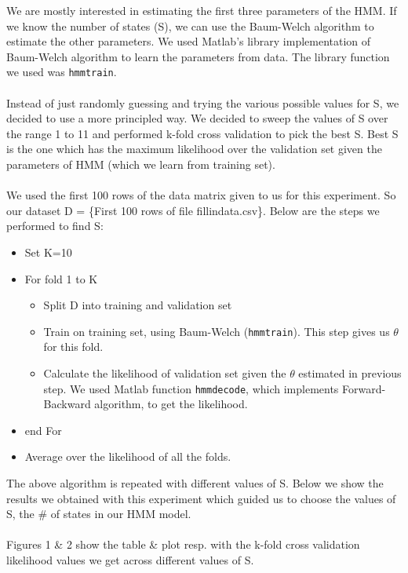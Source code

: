 \documentclass[12pt]{article}
\begin{document}
We are mostly interested in estimating the first three parameters of the HMM. If we know the number of states (S), we can use the Baum-Welch algorithm to estimate the other parameters. We used Matlab's library implementation of Baum-Welch algorithm to learn the parameters from data. The library function we used was \verb|hmmtrain|. \\
\\
Instead of just randomly guessing and trying the various possible values for S, we decided to use a more principled way. We decided to sweep the values of S over the range 1 to 11 and performed k-fold cross validation to pick the best S. Best S is the one which has the maximum likelihood over the validation set given the parameters of HMM (which we learn from training set). \\
\\
We used the first 100 rows of the data matrix given to us for this experiment. So our dataset D = \{First 100 rows of file fillindata.csv\}. Below are the steps we performed to find S:
\begin{itemize}
    \item Set K=10
    \item For fold 1 to K
    \begin{itemize}
        \item Split D into training and validation set
        \item Train on training set, using Baum-Welch (\verb|hmmtrain|). This step gives us $\theta$ for this fold.
        \item Calculate the likelihood of validation set given the $\theta$ estimated in previous step. We used Matlab function \verb|hmmdecode|, which implements Forward-Backward algorithm, to get the likelihood.
    \end{itemize}
    \item end For
    \item Average over the likelihood of all the folds.
    
\end{itemize}


The above algorithm is repeated with different values of S. Below we show the results we obtained with this experiment which guided us to choose the values of S, the \# of states in our HMM model.\\
\\
Figures 1 \& 2 show the table \& plot resp. with the k-fold cross validation likelihood values we get across different values of S. 
\end{document}

